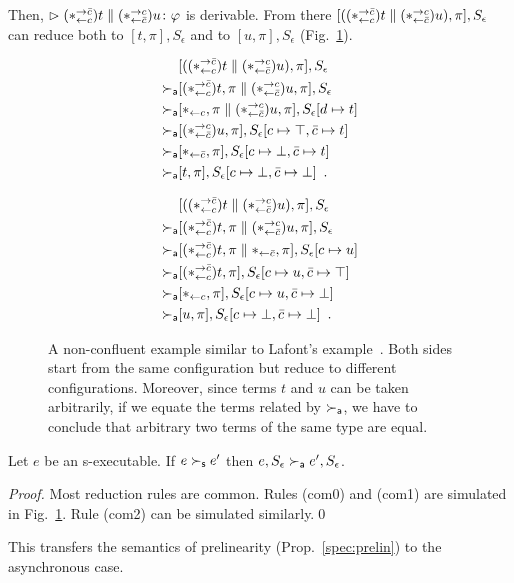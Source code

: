 \documentclass[envcountsame]{llncs}
\begin{document}
Then,
$\vartriangleright{(\ast^{\rightarrow {\bar{c}}}_{\leftarrow{c}})t\parallel(\ast^{\rightarrow {c}}_{\leftarrow{\bar{c}}})u} \colon{\varphi}$ is derivable.
From there $[((\ast^{\rightarrow {\bar{c}}}_{\leftarrow{c}})t\parallel (\ast^{\rightarrow {c}}_{\leftarrow{\bar{c}}})u),
\pi],S_\epsilon$
can reduce both to $[t,\pi], S_\epsilon$
and to $[u,\pi], S_\epsilon$ (Fig.~\ref{fig:lafont}).
\begin{figure}
 \begin{subfigure}[b]{0.45\textwidth}
  \begin{align*}
   & [((\ast^{\rightarrow {\bar{c}}}_{\leftarrow{c}})t\parallel (\ast^{\rightarrow {c}}_{\leftarrow{\bar{c}}}) u),\pi], S_\epsilon \\
   \succ_{\mathsf a} & [(\ast^{\rightarrow {\bar{c}}}_{\leftarrow{c}})t,\pi\parallel (\ast^{\rightarrow {c}}_{\leftarrow{\bar{c}}})u,\pi], S_\epsilon \\
   \succ_{\mathsf a} & [\ast_{\leftarrow{c}}, \pi\parallel (\ast^{\rightarrow {c}}_{\leftarrow{\bar{c}}})u,\pi], S_\epsilon[d\mapsto
   t] \\
   \succ_{\mathsf a} & [(\ast^{\rightarrow {c}}_{\leftarrow{\bar{c}}})u,\pi], S_\epsilon[c\mapsto \top, \bar{c}\mapsto t] \\
   \succ_{\mathsf a} & [\ast_{\leftarrow{\bar{c}}}, \pi], S_\epsilon[c\mapsto \bot, \bar{c}\mapsto t] \\
   \succ_{\mathsf a} & [t,\pi], S_\epsilon[c\mapsto \bot,\bar{c}\mapsto \bot]\enspace.
  \end{align*}
 \end{subfigure}
 \begin{subfigure}[b]{0.45\textwidth}
  \begin{align*}
   & [((\ast^{\rightarrow {\bar{c}}}_{\leftarrow{c}})t\parallel (\ast^{\rightarrow {c}}_{\leftarrow{\bar{c}}}) u),\pi], S_\epsilon \\
   \succ_{\mathsf a} & [(\ast^{\rightarrow {\bar{c}}}_{\leftarrow{c}})t,\pi\parallel (\ast^{\rightarrow {c}}_{\leftarrow{\bar{c}}})u,\pi], S_\epsilon \\
   \succ_{\mathsf a} & [(\ast^{\rightarrow {\bar{c}}}_{\leftarrow{c}})t,\pi\parallel \ast_{\leftarrow{\bar{c}}},\pi], S_\epsilon[c\mapsto u] \\
   \succ_{\mathsf a} & [(\ast^{\rightarrow {\bar{c}}}_{\leftarrow{c}})t,\pi], S_\epsilon[c\mapsto u, \bar{c}\mapsto \top] \\
   \succ_{\mathsf a} & [\ast_{\leftarrow{c}},\pi], S_\epsilon[c\mapsto u,\bar{c}\mapsto \bot] \\
   \succ_{\mathsf a} & [u,\pi], S_\epsilon[c\mapsto \bot,\bar{c}\mapsto \bot]\enspace.
  \end{align*}
 \end{subfigure}
 \caption[A non-confluent example similar to Lafont's example.]
 {A non-confluent example similar to Lafont's example~\citep[B.1]{girard1989proofs}.  Both sides start
 from the same configuration but reduce to different configurations.
 Moreover, since terms $t$ and $u$ can be taken arbitrarily, if we
 equate the terms related by $\succ_{\mathsf a}$, we have to conclude that arbitrary
 two terms of the same type are equal.}
 \label{fig:lafont}
\end{figure}

\begin{proposition}
 Let $e$ be an s-executable.
 If $e\succ_{\mathsf s} e'$ then $e, S_\epsilon \succ_{\mathsf a} e', S_\epsilon$.
\end{proposition}
\begin{proof}
 Most reduction rules are common.  Rules (com0) and (com1) are
 simulated in Fig.~\ref{fig:lafont}.  Rule (com2) can be simulated similarly.\qed
\end{proof}
This transfers the semantics of prelinearity (Prop.~\ref{spec:prelin}) to the asynchronous case.
\end{document}
